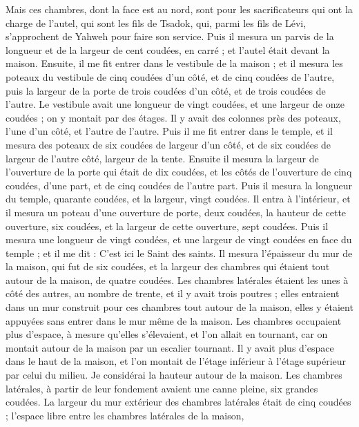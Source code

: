 \begin{multicols}{2}
Mais ces chambres, dont la face est au nord, sont pour les sacrificateurs qui ont la charge de l'autel, qui sont les fils de Tsadok, qui, parmi les fils de Lévi, s'approchent de Yahweh pour faire son service.
Puis il mesura un parvis de la longueur et de la largeur de cent coudées, en carré ; et l'autel était devant la maison.
Ensuite, il me fit entrer dans le vestibule de la maison ; et il mesura les poteaux du vestibule de cinq coudées d’un côté, et de cinq coudées de l’autre, puis la largeur de la porte de trois coudées d’un côté, et de trois coudées de l’autre.
Le vestibule avait une longueur de vingt coudées, et une largeur de onze coudées ; on y montait par des étages. Il y avait des colonnes près des poteaux, l’une d’un côté, et l’autre de l’autre.
\VerseOne{}Puis il me fit entrer dans le temple, et il mesura des poteaux de six coudées de largeur d'un côté, et de six coudées de largeur de l'autre côté, largeur de la tente.
Ensuite il mesura la largeur de l'ouverture de la porte qui était de dix coudées, et les côtés de l'ouverture de cinq coudées, d'une part, et de cinq coudées de l'autre part. Puis il mesura la longueur du temple, quarante coudées, et la largeur, vingt coudées.
Il entra à l'intérieur, et il mesura un poteau d'une ouverture de porte, deux coudées, la hauteur de cette ouverture, six coudées, et la largeur de cette ouverture, sept coudées.
Puis il mesura une longueur de vingt coudées, et une largeur de vingt coudées en face du temple ; et il me dit : C'est ici le Saint des saints.
Il mesura l'épaisseur du mur de la maison, qui fut de six coudées, et la largeur des chambres qui étaient tout autour de la maison, de quatre coudées.
Les chambres latérales étaient les unes à côté des autres, au nombre de trente, et il y avait trois poutres ; elles entraient dans un mur construit pour ces chambres tout autour de la maison, elles y étaient appuyées sans entrer dans le mur même de la maison.
Les chambres occupaient plus d’espace, à mesure qu’elles s’élevaient, et l’on allait en tournant, car on montait autour de la maison par un escalier tournant. Il y avait plus d’espace dans le haut de la maison, et l’on montait de l’étage inférieur à l’étage supérieur par celui du milieu.
Je considérai la hauteur autour de la maison. Les chambres latérales, à partir de leur fondement avaient une canne pleine, six grandes coudées.
La largeur du mur extérieur des chambres latérales était de cinq coudées ; l’espace libre entre les chambres latérales de la maison,

\end{multicols}
